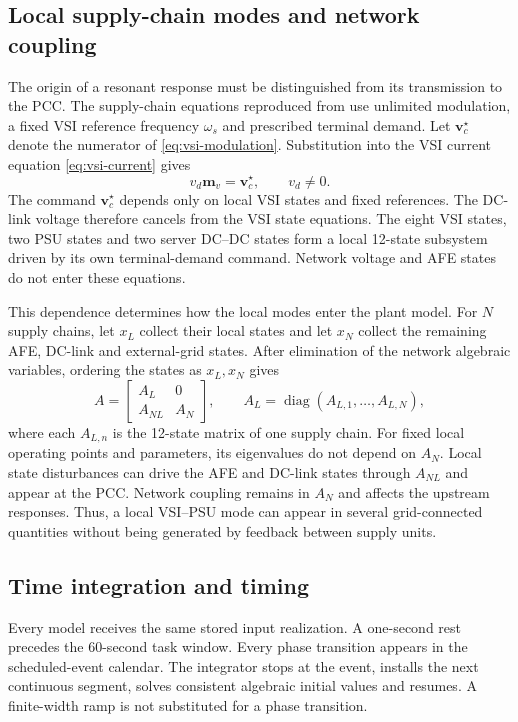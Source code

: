 \subsection{Local supply-chain modes and network coupling}
The origin of a resonant response must be distinguished from its transmission to the PCC.
The supply-chain equations reproduced from \cite{zhao2026dynamic} use unlimited modulation, a fixed VSI reference frequency $\omega_s$ and prescribed terminal demand.
Let $\bm v_c^\star$ denote the numerator of \eqref{eq:vsi-modulation}.
Substitution into the VSI current equation \eqref{eq:vsi-current} gives
\begin{equation}
v_d\bm m_v=\bm v_c^\star,\qquad v_d\ne0.
\end{equation}
The command $\bm v_c^\star$ depends only on local VSI states and fixed references.
The DC-link voltage therefore cancels from the VSI state equations.
The eight VSI states, two PSU states and two server DC--DC states form a local 12-state subsystem driven by its own terminal-demand command.
Network voltage and AFE states do not enter these equations.

This dependence determines how the local modes enter the plant model.
For $N$ supply chains, let $x_L$ collect their local states and let $x_N$ collect the remaining AFE, DC-link and external-grid states.
After elimination of the network algebraic variables, ordering the states as $x_L,x_N$ gives
\begin{equation}
A=\begin{bmatrix}A_L&0\\A_{NL}&A_N\end{bmatrix},\qquad
A_L=\operatorname{diag}(A_{L,1},\ldots,A_{L,N}),
\end{equation}
where each $A_{L,n}$ is the 12-state matrix of one supply chain.
For fixed local operating points and parameters, its eigenvalues do not depend on $A_N$.
Local state disturbances can drive the AFE and DC-link states through $A_{NL}$ and appear at the PCC.
Network coupling remains in $A_N$ and affects the upstream responses.
Thus, a local VSI--PSU mode can appear in several grid-connected quantities without being generated by feedback between supply units.

\subsection{Time integration and timing}
Every model receives the same stored input realization.
A one-second rest precedes the 60-second task window.
Every phase transition appears in the scheduled-event calendar.
The integrator stops at the event, installs the next continuous segment, solves consistent algebraic initial values and resumes.
A finite-width ramp is not substituted for a phase transition.

